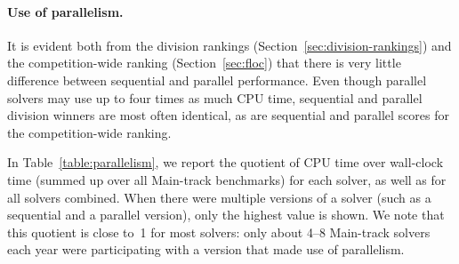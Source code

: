 \documentclass[dvipsnames,table,twoside,11pt]{article}
\begin{document}
\paragraph{Use of parallelism.}

It is evident both from the division rankings
(Section~\ref{sec:division-rankings}) and the competition-wide ranking
(Section~\ref{sec:floc}) that there is very little difference between
sequential and parallel performance.  Even though parallel solvers may
use up to four times as much CPU time, sequential and parallel
division winners are most often identical, as are sequential and
parallel scores for the competition-wide ranking.


In Table~\ref{table:parallelism}, we report the quotient of CPU time
over wall-clock time (summed up over all Main-track benchmarks) for
each solver, as well as for all solvers combined.  When there were
multiple versions of a solver (such as a sequential and a parallel
version), only the highest value is shown.  We note that this quotient
is close to~1 for most solvers: only about 4--8 Main-track solvers
each year were participating with a version that made use of
parallelism.
\end{document}
